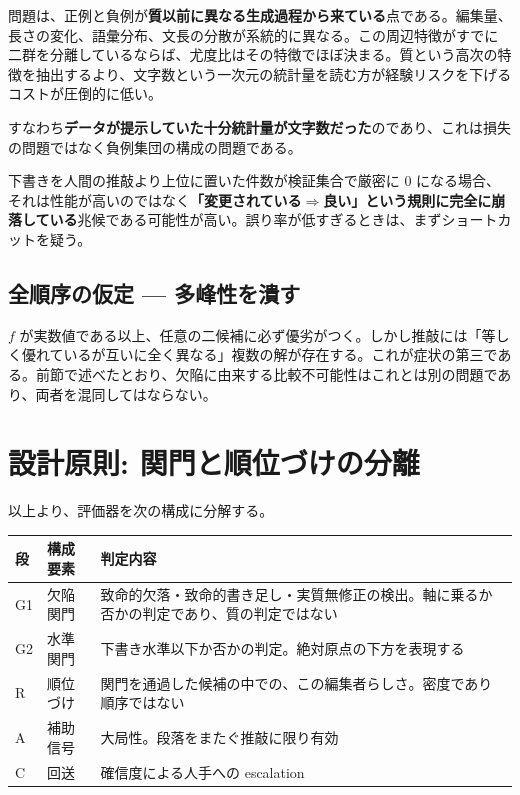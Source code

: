 \documentclass[a4paper,10.5pt]{ltjsarticle}
\begin{document}
問題は、正例と負例が\textbf{質以前に異なる生成過程から来ている}点である。編集量、長さの変化、語彙分布、文長の分散が系統的に異なる。この周辺特徴がすでに二群を分離しているならば、尤度比はその特徴でほぼ決まる。質という高次の特徴を抽出するより、文字数という一次元の統計量を読む方が経験リスクを下げるコストが圧倒的に低い。

すなわち\textbf{データが提示していた十分統計量が文字数だった}のであり、これは損失の問題ではなく負例集団の構成の問題である。

\begin{warnbox}[title=退化の兆候]
下書きを人間の推敲より上位に置いた件数が検証集合で厳密に $0$ になる場合、それは性能が高いのではなく\textbf{「変更されている$\Rightarrow$良い」という規則に完全に崩落している}兆候である可能性が高い。誤り率が低すぎるときは、まずショートカットを疑う。
\end{warnbox}

\subsection{全順序の仮定 --- 多峰性を潰す}

$f$ が実数値である以上、任意の二候補に必ず優劣がつく。しかし推敲には「等しく優れているが互いに全く異なる」複数の解が存在する。これが症状の第三である。前節で述べたとおり、欠陥に由来する比較不可能性はこれとは別の問題であり、両者を混同してはならない。

\section{設計原則: 関門と順位づけの分離}

以上より、評価器を次の構成に分解する。

\begin{center}
\begin{tabularx}{\textwidth}{@{}p{2.4em} p{7.5em} X@{}}
\toprule
\sffamily\bfseries 段 & \sffamily\bfseries 構成要素 & \sffamily\bfseries 判定内容 \\
\midrule
G1 & 欠陥関門 & 致命的欠落・致命的書き足し・実質無修正の検出。軸に乗るか否かの判定であり、質の判定ではない \\
G2 & 水準関門 & 下書き水準以下か否かの判定。絶対原点の下方を表現する \\
R  & 順位づけ & 関門を通過した候補の中での、この編集者らしさ。密度であり順序ではない \\
A  & 補助信号 & 大局性。段落をまたぐ推敲に限り有効 \\
C  & 回送 & 確信度による人手への escalation \\
\bottomrule
\end{tabularx}
\end{center}
\end{document}
